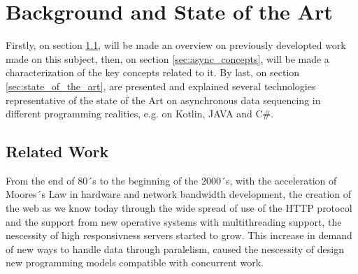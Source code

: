% 
%  
%
\chapter{Background and State of the Art}
\label{cha:users_manual}

Firstly, on section \ref{sec:related_work}, will be made an overview on previously developted work made on this subject, then, on section \ref{sec:async_concepts}, will be made a characterization of the key concepts related to it. By last, on section \ref{sec:state_of_the_art}, are presented and explained several technologies representative of the state of the Art on asynchronous data sequencing in different programming realities, e.g. on Kotlin, JAVA and C\#. 


\section{Related Work} %
\label{sec:related_work}


From the end of 80´s to the beginning of the 2000´s, with the acceleration of Moores´s Law in hardware and network bandwidth development, the creation of the web as we know today through the wide spread of use of the HTTP protocol and the support from new operative systems with multithreading support, the nescessity of high responsivness servers started to grow. This increase in demand of new ways to handle data through paralelism, caused the nescessity of design new programming models compatible with concurrent work. 

